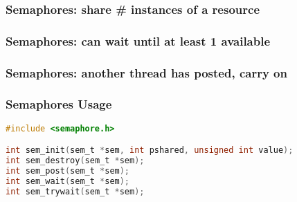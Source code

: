 \begin{frame}
  \frametitle{Semaphores: share \# instances of a resource}

  \begin{center}
    
  \end{center}

\end{frame}

\begin{frame}
  \frametitle{Semaphores: can wait until at least 1 available}

  \begin{center}
    
  \end{center}

\end{frame}

\begin{frame}
  \frametitle{Semaphores: another thread has posted, carry on}

  \begin{center}
    
  \end{center}

\end{frame}



\begin{frame}[fragile]
  \frametitle{Semaphores Usage}
  

  \begin{lstlisting}[language=C]
#include <semaphore.h>

int sem_init(sem_t *sem, int pshared, unsigned int value);
int sem_destroy(sem_t *sem);
int sem_post(sem_t *sem);
int sem_wait(sem_t *sem);
int sem_trywait(sem_t *sem);
  \end{lstlisting}

\end{frame}


